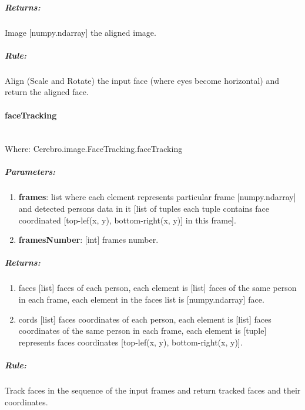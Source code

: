 \subparagraph{Returns:}
\begin{changemargin}{1cm}{0cm}
	Image [numpy.ndarray] the aligned image.
\end{changemargin}

\subparagraph{Rule:}
\begin{changemargin}{1cm}{0cm}
	Align (Scale and Rotate) the input face (where eyes become horizontal) and return the aligned face.
\end{changemargin}


\paragraph{faceTracking} \mbox{} \\
Where: Cerebro.image.FaceTracking.faceTracking
\subparagraph{Parameters:}
\begin{changemargin}{0.5cm}{0cm}
	\begin{enumerate}
		\item \textbf{frames}: list where each element represents particular frame [numpy.ndarray] and detected persons data in it [list of tuples each tuple contains face coordinated [top-lef(x, y), bottom-right(x, y)] in this frame].
		\item \textbf{framesNumber}: [int] frames number.
	\end{enumerate}
\end{changemargin}

\subparagraph{Returns:}
\begin{changemargin}{1cm}{0cm}
	\begin{enumerate} 
		\item faces [list] faces of each person, each element is [list] faces of the same person in each frame, each element in the faces list is [numpy.ndarray] face.
		\item cords [list] faces coordinates of each person, each element is [list] faces coordinates of the same person in each frame, each element is [tuple] represents faces coordinates [top-lef(x, y), bottom-right(x, y)].
	\end{enumerate}
\end{changemargin}

\subparagraph{Rule:}
\begin{changemargin}{1cm}{0cm}
	Track faces in the sequence of the input frames and return tracked faces and their coordinates.
\end{changemargin}